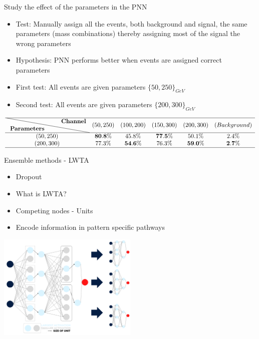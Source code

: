 \documentclass[UKenglish]{beamer}
\begin{document}
\begin{frame}{Study the effect of the parameters in the PNN}
    \begin{itemize}
        \item Test: Manually assign all the events, both background and 
        signal, the same parameters (mass combinations) thereby assigning
        most of the signal the wrong parameters
        \item Hypothesis: PNN performs better when events are assigned correct
        parameters 
        \item First test: All events are given parameters $\{50,250\}_{GeV}$
        \item Second test: All events are given parameters $\{200,300\}_{GeV}$
    \end{itemize}
    \begin{table}
        \tiny
        \centering
        $
        \begin{array}{cccccc}
            \hline \text { \diagbox{\textbf{Parameters}}{\textbf{Channel}} }  & \text {$(50,250)$} & \text {$(100,200)$} & \text {$(150,300)$} & \text {$(200,300)$} & \text {$(Background)$} \\
            \hline \text {$(50,250)$}   & \text { $\bf{80.8}\%$ } & \text { $45.8\%$ } & \text { $\bf{77.5}\%$ } & \text { $50.1\%$ } & \text { $2.4\%$ }  \\
            \text {$(200,300)$}   & \text { $77.3\%$ } & \text { $\bf{54.6}\%$ } & \text { $76.3\%$ } & \text { $\bf{59.0}\%$ } & \text { $\bf{2.7}\%$ }\\
            \hline
        \end{array}
        $
    \end{table}
\end{frame}

\begin{frame}{Ensemble methods - LWTA}
    \begin{itemize}
        \item Dropout
        \item What is LWTA?
        \item Competing nodes - Units
        \item Encode information in pattern specific pathways
    \end{itemize}    
    \centering
    \includegraphics[width = 0.5\textwidth]{figures/Max_out}
\end{frame}
\end{document}
